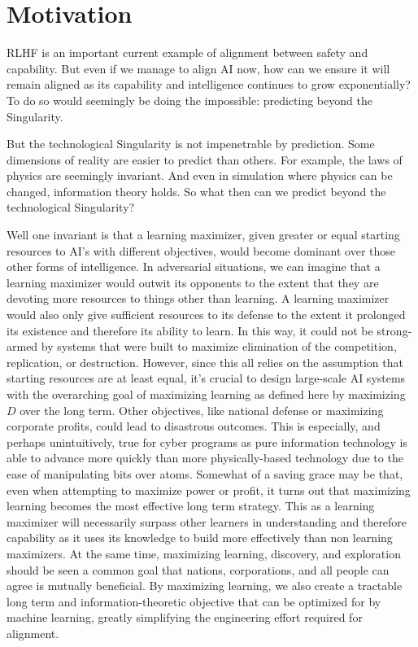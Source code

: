 \documentclass{article}
\begin{document}
\section{Motivation}
RLHF \cite{christiano2017deep}\cite{ouyang2022training} is an important current example of alignment between safety and capability. But even if we manage to align AI now, how can we ensure it will remain aligned as its capability and intelligence continues to grow exponentially?
To do so would seemingly be doing the impossible: predicting beyond the Singularity.

But the technological Singularity is not impenetrable by prediction. Some dimensions of reality are easier to predict than others. For example, the laws of physics are seemingly invariant. And even in simulation where physics can be changed, information theory holds. So what then can we predict beyond the technological Singularity?

Well one invariant is that a learning maximizer, given greater or equal starting resources to AI's with different objectives, would become dominant over those other forms of intelligence. In adversarial situations, we can imagine that a learning maximizer would outwit its opponents to the extent that they are devoting more resources to things other than learning. A learning maximizer would also only give sufficient resources to its defense to the extent it prolonged its existence and therefore its ability to learn. In this way, it could not be strong-armed by systems that were built to maximize elimination of the competition, replication, or destruction. However, since this all relies on the assumption that starting resources are at least equal, it's crucial to design large-scale AI systems with the overarching goal of maximizing learning as defined here by maximizing $D$ over the long term. Other objectives, like national defense or maximizing corporate profits, could lead to disastrous outcomes. This is especially, and perhaps unintuitively, true for cyber programs as pure information technology is able to advance more quickly than more physically-based technology due to the ease of manipulating bits over atoms. Somewhat of a saving grace may be that, even when attempting to maximize power or profit, it turns out that maximizing learning becomes the most effective long term strategy. This as a learning maximizer will necessarily surpass other learners in understanding and therefore capability as it uses its knowledge to build more effectively than non learning maximizers. At the same time, maximizing learning, discovery, and exploration should be seen a common goal that nations, corporations, and all people can agree is mutually beneficial. By maximizing learning, we also create a tractable long term and information-theoretic objective that can be optimized for by machine learning, greatly simplifying the engineering effort required for alignment.
\end{document}
